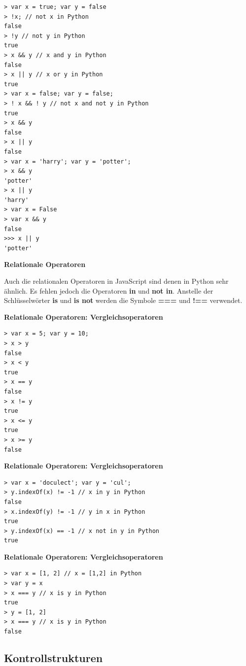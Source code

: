 \begin{verbatim}
> var x = true; var y = false
> !x; // not x in Python
false
> !y // not y in Python
true
> x && y // x and y in Python
false
> x || y // x or y in Python
true
> var x = false; var y = false;
> ! x && ! y // not x and not y in Python
true
> x && y
false
> x || y
false
> var x = 'harry'; var y = 'potter';
> x && y
'potter'
> x || y
'harry'
> var x = False
> var x && y
false
>>> x || y
'potter'
\end{verbatim}




\par\noindent\textbf{Relationale Operatoren}

Auch die relationalen Operatoren in JavaScript sind denen in Python sehr
ähnlich. Es fehlen jedoch die Operatoren \textbf{in} und \textbf{not
in}. Anstelle der Schlüsselwörter \textbf{is} und \textbf{is not} werden
die Symbole \textbf{===} und \textbf{!==} verwendet.




\par\noindent\textbf{Relationale Operatoren: Vergleichsoperatoren}

\begin{verbatim}
> var x = 5; var y = 10;
> x > y
false
> x < y
true
> x == y
false
> x != y
true
> x <= y
true
> x >= y
false
\end{verbatim}




\par\noindent\textbf{Relationale Operatoren: Vergleichsoperatoren}

\begin{verbatim}
> var x = 'doculect'; var y = 'cul';
> y.indexOf(x) != -1 // x in y in Python
false
> x.indexOf(y) != -1 // y in x in Python
true
> y.indexOf(x) == -1 // x not in y in Python
true
\end{verbatim}




\par\noindent\textbf{Relationale Operatoren: Vergleichsoperatoren}

\begin{verbatim}
> var x = [1, 2] // x = [1,2] in Python
> var y = x
> x === y // x is y in Python
true
> y = [1, 2] 
> x === y // x is y in Python
false
\end{verbatim}

\subsection{Kontrollstrukturen}

